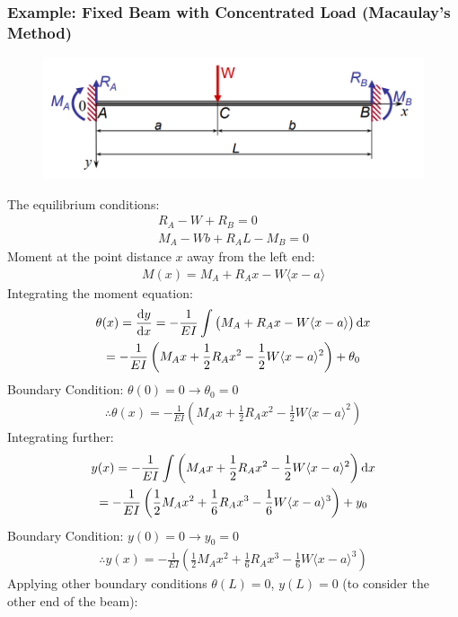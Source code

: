 \documentclass[class=report, crop=false, 12pt,a4paper]{standalone}
\begin{document}
\subsubsection{Example: Fixed Beam with Concentrated Load (Macaulay's Method)}
\begin{figure}[H]
  \centering
  \includegraphics[width = 0.9 \textwidth]{../img/beam13.PNG}
\end{figure}
The equilibrium conditions:
\begin{gather}
  R_A-W+R_B = 0 \\
  M_A-Wb+R_AL-M_B = 0
\end{gather}
Moment at the point distance $x$ away from the left end:
\begin{gather}
  M(x) = M_A+R_Ax-W\langle x-a \rangle 
\end{gather}
Integrating the moment equation:
\begin{gather}
  \theta(x) = \frac{\dif y}{\dif x} = -\frac{1}{EI}\int\left(M_A+R_Ax-W\langle x-a \rangle\right) \dif x \\
  = -\frac{1}{EI}\left(M_Ax+\frac{1}{2}R_Ax^2-\frac{1}{2}W\langle x-a\rangle^2\right) + \theta_0
\end{gather}
Boundary Condition: $\theta(0) = 0 \longrightarrow \theta_0 = 0$
\begin{gather}
  \therefore \theta(x) = -\frac{1}{EI}\left(M_Ax+\frac{1}{2}R_Ax^2-\frac{1}{2}W\langle x-a\rangle^2\right)
\end{gather}
Integrating further:
\begin{gather}
  y(x) = -\frac{1}{EI}\int\left(M_Ax+\frac{1}{2}R_Ax^2-\frac{1}{2}W\langle x-a\rangle^2\right) \dif x \\
  = -\frac{1}{EI}\left(\frac{1}{2}M_Ax^2+\frac{1}{6}R_Ax^3-\frac{1}{6}W\langle x-a \rangle^3\right) + y_0
\end{gather}
Boundary Condition: $y(0) = 0 \longrightarrow y_0 = 0$
\begin{gather}
  \therefore y(x) = -\frac{1}{EI}\left(\frac{1}{2}M_Ax^2+\frac{1}{6}R_Ax^3-\frac{1}{6}W\langle x-a \rangle^3\right)
\end{gather}
Applying other boundary conditions $\theta(L) = 0$, $y(L) = 0$ (to consider the other end of the beam):
\end{document}
